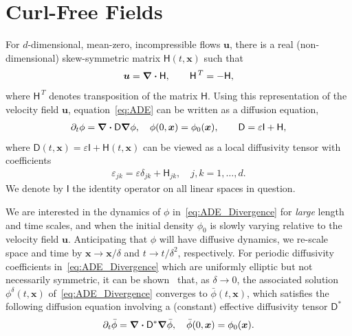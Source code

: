 \documentclass[leqno,onefignum,onetabnum]{siamltex1213}
\newcommand{\Dm}{\mathsf{D}}
\newcommand{\Hm}{\mathsf{H}}
\newcommand{\Ib}{\mathsf{I}}
\newcommand\bnabla{\mbox{\boldmath${\nabla}$}}
\providecommand\bcdot{\boldsymbol{\cdot}}
\newcommand{\vecx}{\boldsymbol{x}}
\newcommand{\vecu}{\boldsymbol{u}}
\begin{document}
\section{Curl-Free Fields}%
%
For $d$-dimensional, mean-zero, incompressible flows $\vecu $, there
is a real (non-dimensional) skew-symmetric 
matrix $\Hm(t,\vecx)$ such that
\begin{align}%
 \vecu =\bnabla \bcdot\Hm, \qquad  \Hm^{\,T}=-\Hm,
\end{align}
where $\Hm^{\,T}$ denotes transposition of the matrix $\Hm$.
Using this representation of the velocity field $\vecu $,
equation~\eqref{eq:ADE} can be written as a diffusion equation,  
%
\begin{align}%
  \partial_t\phi%
    =\bnabla \bcdot\Dm\bnabla \phi, \quad
    \phi(0,\vecx)=\phi_0(\vecx),
    \qquad
    \Dm=\varepsilon\Ib+\Hm,
\end{align}
%
where $\Dm(t,\vecx)=\varepsilon\Ib+\Hm(t,\vecx)$ can be viewed as a local
diffusivity tensor with coefficients
%
\begin{align}%
  \varepsilon_{jk}=\varepsilon\delta_{jk}+\Hm_{jk},\quad j,k=1,\ldots,d.
\end{align}
%
We denote by $\Ib$ the identity operator on all linear spaces in
question.     






We are interested in the dynamics of $\phi$ in~\eqref{eq:ADE_Divergence}
for \emph{large} length and time scales, and when the initial density
$\phi_0$ is slowly varying relative to the velocity field
$\vecu $. Anticipating that $\phi$ will have diffusive dynamics, we
re-scale space and time by $\vecx\to\vecx/\delta$ and $t\to t/\delta^2$,
respectively.  For periodic diffusivity coefficients
in~\eqref{eq:ADE_Divergence} which are uniformly elliptic but not 
necessarily symmetric, it can be shown~\cite{Fannjiang:1994:SIAM_JAM:333}
that, as $\delta\to0$, the associated solution $\phi^\delta(t,\vecx)$
of~\eqref{eq:ADE_Divergence} converges to $\bar{\phi}(t,\vecx)$, 
which satisfies the following diffusion equation involving a (constant)
effective diffusivity tensor $\Dm^*$    
%
\begin{align}%
  \partial_t\bar{\phi}=\bnabla \bcdot\Dm^*\bnabla \bar{\phi}, \quad
  \bar{\phi}(0,\vecx)=\phi_0(\vecx).
\end{align}
%
\end{document}
